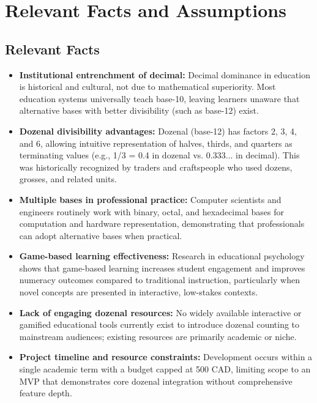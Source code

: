 \documentclass[12pt]{article}
\begin{document}
\section{Relevant Facts and Assumptions}

\subsection{Relevant Facts}
\begin{itemize}
    \item \textbf{Institutional entrenchment of decimal:} Decimal dominance in education is historical and cultural, not due to mathematical superiority. Most education systems universally teach base-10, leaving learners unaware that alternative bases with better divisibility (such as base-12) exist.
    
    \item \textbf{Dozenal divisibility advantages:} Dozenal (base-12) has factors 2, 3, 4, and 6, allowing intuitive representation of halves, thirds, and quarters as terminating values (e.g., 1/3 = 0.4 in dozenal vs. 0.333... in decimal). This was historically recognized by traders and craftspeople who used dozens, grosses, and related units.
    
    \item \textbf{Multiple bases in professional practice:} Computer scientists and engineers routinely work with binary, octal, and hexadecimal bases for computation and hardware representation, demonstrating that professionals can adopt alternative bases when practical.
    
    \item \textbf{Game-based learning effectiveness:} Research in educational psychology shows that game-based learning increases student engagement and improves numeracy outcomes compared to traditional instruction, particularly when novel concepts are presented in interactive, low-stakes contexts.
    
    \item \textbf{Lack of engaging dozenal resources:} No widely available interactive or gamified educational tools currently exist to introduce dozenal counting to mainstream audiences; existing resources are primarily academic or niche.
    
    \item \textbf{Project timeline and resource constraints:} Development occurs within a single academic term with a budget capped at 500 CAD, limiting scope to an MVP that demonstrates core dozenal integration without comprehensive feature depth.
\end{itemize}
\end{document}

